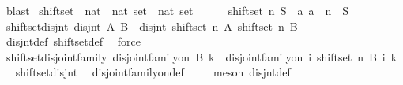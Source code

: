 \begin{isabellebody}
\ blast%
\endisatagproof
{\isafoldproof}%
%
\isadelimproof
\isanewline
%
\endisadelimproof
\isanewline
\isanewline
{}\isamarkupfalse%
\ shiftset\ {\isacharcolon}{\kern0pt}{\isacharcolon}{\kern0pt}\ {\isachardoublequoteopen}nat\ {\isasymRightarrow}\ nat\ set\ {\isasymRightarrow}\ nat\ set{\isachardoublequoteclose}\isanewline
\ \ \isanewline
\ \ \ {\isachardoublequoteopen}shiftset\ n\ S\ {\isasymequiv}\ {\isacharparenleft}{\kern0pt}{\isasymlambda}a{\isachardot}{\kern0pt}\ a\ {\isacharplus}{\kern0pt}\ n{\isacharparenright}{\kern0pt}\ {\isacharbackquote}{\kern0pt}\ S{\isachardoublequoteclose}\isanewline
\isanewline
\isanewline
{}\isamarkupfalse%
\ shiftset{\isacharunderscore}{\kern0pt}disjnt{\isacharcolon}{\kern0pt}\ {\isachardoublequoteopen}disjnt\ A\ B\ {\isasymLongrightarrow}\ disjnt\ {\isacharparenleft}{\kern0pt}shiftset\ n\ A{\isacharparenright}{\kern0pt}\ {\isacharparenleft}{\kern0pt}shiftset\ n\ B{\isacharparenright}{\kern0pt}{\isachardoublequoteclose}\ \isanewline
%
\isadelimproof
\ \ %
\endisadelimproof
%
\isatagproof
{}\isamarkupfalse%
\ disjnt{\isacharunderscore}{\kern0pt}def\ shiftset{\isacharunderscore}{\kern0pt}def\ \isamarkupfalse%
\ force%
\endisatagproof
{\isafoldproof}%
%
\isadelimproof
\isanewline
%
\endisadelimproof
{}\isamarkupfalse%
\ shiftset{\isacharunderscore}{\kern0pt}disjoint{\isacharunderscore}{\kern0pt}family{\isacharcolon}{\kern0pt}\ {\isachardoublequoteopen}disjoint{\isacharunderscore}{\kern0pt}family{\isacharunderscore}{\kern0pt}on\ B\ {\isacharbraceleft}{\kern0pt}{\isachardot}{\kern0pt}{\isachardot}{\kern0pt}k{\isacharbraceright}{\kern0pt}\ {\isasymLongrightarrow}\ disjoint{\isacharunderscore}{\kern0pt}family{\isacharunderscore}{\kern0pt}on\ {\isacharparenleft}{\kern0pt}{\isasymlambda}i{\isachardot}{\kern0pt}\ shiftset\ n\ {\isacharparenleft}{\kern0pt}B\ i{\isacharparenright}{\kern0pt}{\isacharparenright}{\kern0pt}\ {\isacharbraceleft}{\kern0pt}{\isachardot}{\kern0pt}{\isachardot}{\kern0pt}k{\isacharbraceright}{\kern0pt}{\isachardoublequoteclose}%
\isadelimproof
\ %
\endisadelimproof
%
\isatagproof
{}\isamarkupfalse%
\ shiftset{\isacharunderscore}{\kern0pt}disjnt\ \isamarkupfalse%
\ disjoint{\isacharunderscore}{\kern0pt}family{\isacharunderscore}{\kern0pt}on{\isacharunderscore}{\kern0pt}def\ \isanewline
\ \ \isamarkupfalse%
\ {\isacharparenleft}{\kern0pt}meson\ disjnt{\isacharunderscore}{\kern0pt}def{\isacharparenright}{\kern0pt}%
\endisatagproof
{\isafoldproof}%
%
\isadelimproof

\end{isabellebody}
